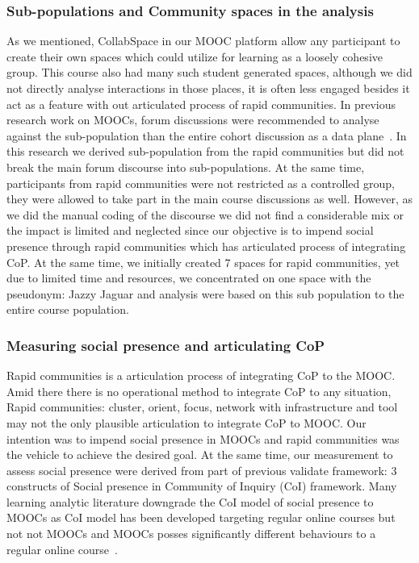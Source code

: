 \documentclass[manuscript,screen,review]{acmart}
\begin{document}
\subsubsection{Sub-populations and Community spaces in the analysis}
As we mentioned, CollabSpace in our MOOC platform allow any participant to create their own spaces which could utilize for learning as a loosely cohesive group. This course also had many such student generated spaces, although we did not directly analyse interactions in those places, it is often less engaged besides it act as a feature with out articulated process of rapid communities. 
In previous research work on MOOCs, forum discussions were recommended to analyse against the sub-population than the entire cohort discussion as a data plane~\cite{poquet2018social}. In this research we derived sub-population from the rapid communities but did not break the main forum discourse into sub-populations. At the same time, participants from rapid communities were not restricted as a controlled group, they were allowed to take part in the main course discussions as well. However, as we did the manual coding of the discourse we did not find a considerable mix or the impact is  limited and neglected since our objective is to impend social presence through rapid communities which has articulated process of integrating CoP. At the same time, we initially created 7 spaces for rapid communities, yet due to limited time and resources, we concentrated on one space with the pseudonym: Jazzy Jaguar and analysis were based on this sub population to the entire course population. 

\subsubsection{Measuring social presence and articulating CoP}
Rapid communities is a articulation process of integrating CoP to the MOOC. Amid there there is no operational method to integrate CoP to any situation, Rapid communities: cluster, orient, focus, network with infrastructure and tool may not the only plausible articulation to integrate CoP to MOOC. Our intention was to impend social presence in MOOCs and rapid communities was the vehicle to achieve the desired goal. At the same time, our measurement to assess social presence were derived from part of previous validate framework: 3 constructs of Social presence in Community of Inquiry (CoI) framework. Many learning analytic literature downgrade the CoI model of social presence to MOOCs as CoI model has been developed targeting regular online courses but not not MOOCs and MOOCs posses significantly different behaviours to a regular online course~\cite{poquet2018mooc}.
\end{document}
